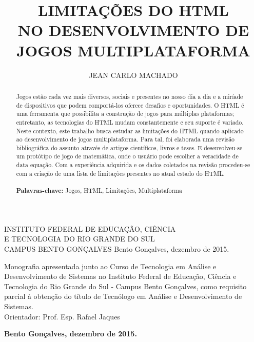\documentclass[
12pt,
a4paper,
portuges,
]{report}
\title{\uppercase{Limitações do HTML \\ no desenvolvimento de jogos multiplataforma}}
\author{\uppercase{Jean Carlo Machado}}
\newcommand{\university}{\uppercase{Instituto Federal de Educação, Ciência \\ e Tecnologia do Rio Grande do Sul \\ Campus Bento Gonçalves}}
\newcommand{\locale}{Bento Gonçalves, dezembro de 2015.}
\begin{document}


\begin{titlepage}
    \begin{center}
        {\fontsize{14}{18}\selectfont \university}
        \vfill
        {\fontsize{16}{19}\selectfont \thetitle }
        \vfill
        {\fontsize{12}{15}\selectfont \theauthor}
        \vfill
        {\locale}
    \end{center}
\end{titlepage}


\begin{titlepage}
    \begin{center}
        {\fontsize{14}{18}\selectfont \theauthor}
        \vfill
        {\fontsize{16}{19}\selectfont \thetitle }
        \vfill
        \hfill
        \parbox[s]{8cm}{
        \singlespacing
            Monografia apresentada junto ao Curso
        de Tecnologia em Análise e Desenvolvimento de Sistemas no
    Instituto Federal de Educação, Ciência e Tecnologia do Rio
Grande do Sul - Campus Bento Gonçalves, como requisito parcial à
obtenção do título de Tecnólogo em Análise e Desenvolvimento de Sistemas.
        \\
        Orientador: Prof. Esp. Rafael Jaques
        }
        \vfill
        {\bfseries \locale}
    \end{center}
\end{titlepage}

\onehalfspacing
\renewcommand{\abstractname}{\Large\bfseries RESUMO}
\begin{abstract}
{
Jogos estão cada vez mais diversos, sociais e presentes no nosso dia
a dia e a miríade de dispositivos que podem comportá-los oferece
desafios e oportunidades. O HTML é uma ferramenta que possibilita
a construção de jogos para múltiplas plataformas; entretanto, as
tecnologias do HTML mudam constantemente e seu suporte é variado. Neste
contexto, este trabalho busca estudar as limitações do HTML quando
aplicado ao desenvolvimento de jogos multiplataforma. Para tal, foi
elaborada uma revisão bibliográfica do assunto através de artigos
científicos, livros e teses. E desenvolveu-se um protótipo de jogo
de matemática, onde o usuário pode escolher a veracidade de data
equação. Com a experiência adquirida e os dados coletados na revisão
procedeu-se com a criação de uma lista de limitações presentes no
atual estado do HTML.
}
\\
\\
{\bfseries Palavras-chave:} Jogos, HTML, Limitações,
Multiplataforma
\end{abstract}
\end{document}
